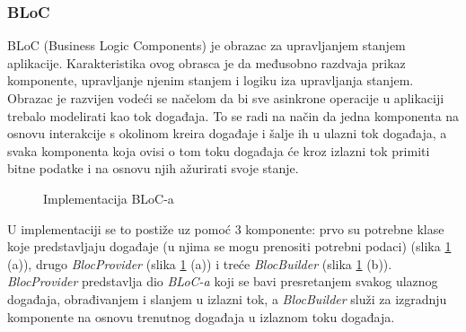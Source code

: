 \documentclass[times, utf8, zavrsni]{fer}
\begin{document}
\subsubsection{BLoC}
BLoC (Business Logic Components) je obrazac za upravljanjem stanjem aplikacije. Karakteristika ovog obrasca
je da međusobno razdvaja prikaz komponente, upravljanje njenim stanjem i logiku iza upravljanja stanjem.
Obrazac je razvijen vodeći se načelom da bi sve asinkrone operacije u aplikaciji trebalo modelirati kao tok događaja. To se
radi na način da jedna komponenta
na osnovu interakcije s okolinom kreira događaje i šalje ih u ulazni tok događaja, a svaka komponenta koja
ovisi o tom toku događaja će kroz izlazni tok primiti bitne podatke i na osnovu njih ažurirati svoje stanje.
\begin{figure}[h]
      \centering
      \caption{Implementacija BLoC-a}
      \label{fig:BLoC}
\end{figure}
U implementaciji se to postiže uz pomoć 3 komponente: prvo su potrebne klase koje predstavljaju događaje (u njima se mogu prenositi
potrebni podaci) (slika \ref{fig:BLoC} (a)), drugo \textit{BlocProvider} (slika \ref{fig:BLoC} (a))
i treće \textit{BlocBuilder} (slika \ref{fig:BLoC} (b)). \textit{BlocProvider} predstavlja dio \textit{BLoC-a}
koji se bavi presretanjem svakog ulaznog događaja, obrađivanjem i slanjem u izlazni tok, a \textit{BlocBuilder}
služi za izgradnju komponente na osnovu trenutnog događaja u izlaznom toku događaja.
\end{document}
